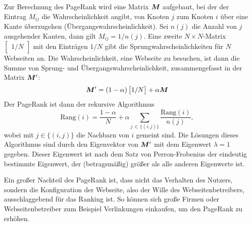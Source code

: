 			Zur Berechnung des PageRank wird eine Matrix \( \bm{M} \) aufgebaut, bei der der Eintrag \(M_{ij}\) die Wahrscheinlichkeit angibt, von Knoten \(j\) zum Knoten \(i\) über eine Kante überzugehen (Übergangswahrscheinlichkeit). Sei \( n(j) \) die Anzahl von \(j\) ausgehender Kanten, dann gilt \( M_{ij} = 1 / n(j) \). Eine zweite \(N \times N\)-Matrix \( \begin{bmatrix} 1/N \end{bmatrix} \) mit den Einträgen \(1/N\) gibt die Sprungwahrscheinlichkeiten für \(N\) Webseiten an. Die Wahrscheinlichkeit, eine Webseite zu besuchen, ist dann die Summe von Sprung- und Übergangswahrscheinlichkeit, zusammengefasst in der Matrix \(\bm{M}'\):
			\begin{equation}
				\bm{M}' = (1 - \alpha) \begin{bmatrix} 1/N \end{bmatrix} + \alpha \bm{M}
			\end{equation}
			Der PageRank ist dann der rekursive Algorithmus
			\begin{equation}
				\text{Rang}(i) = \frac{1 - \alpha}{N} + \alpha \sum_{j \,\in\, \{ (i, j) \}} \frac{\text{Rang}(i)}{n(j)},
			\end{equation}
			wobei mit \( j \in \big\{ (i, j) \big\} \) die Nachbarn von \(i\) gemeint sind. Die Lösungen dieses Algorithmus sind durch den Eigenvektor von \(\bm{M}'\) mit dem Eigenwert \( \lambda = 1 \) gegeben. Dieser Eigenwert ist nach dem Satz von Perron-Frobenius der eindeutig bestimmte Eigenwert, der (betragsmäßig) größer als alle anderen Eigenwerte ist.

			Ein großer Nachteil des PageRank ist, dass nicht das Verhalten des Nutzers, sondern die Konfiguration der Webseite, also der Wille des Webseitenbetreibers, ausschlaggebend für das Ranking ist. So können sich große Firmen oder Webseitenbetreiber zum Beispiel Verlinkungen einkaufen, um den PageRank zu erhöhen.
